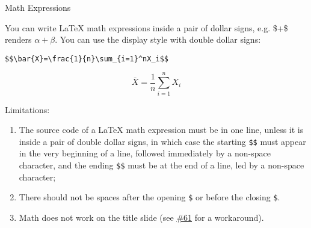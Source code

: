 \documentclass[ignorenonframetext,]{beamer}
\begin{document}
\begin{frame}[fragile]{Math Expressions}
\protect\hypertarget{math-expressions}{}

You can write LaTeX math expressions inside a pair of dollar signs, e.g.
\$\alpha+\beta\$ renders \(\alpha+\beta\). You can use the display style
with double dollar signs:

\begin{verbatim}
$$\bar{X}=\frac{1}{n}\sum_{i=1}^nX_i$$
\end{verbatim}

\[\bar{X}=\frac{1}{n}\sum_{i=1}^nX_i\]

Limitations:

\begin{enumerate}
\item
  The source code of a LaTeX math expression must be in one line, unless
  it is inside a pair of double dollar signs, in which case the starting
  \texttt{\$\$} must appear in the very beginning of a line, followed
  immediately by a non-space character, and the ending \texttt{\$\$}
  must be at the end of a line, led by a non-space character;
\item
  There should not be spaces after the opening \texttt{\$} or before the
  closing \texttt{\$}.
\item
  Math does not work on the title slide (see
  \href{https://github.com/yihui/xaringan/issues/61}{\#61} for a
  workaround).
\end{enumerate}

\end{frame}
\end{document}
